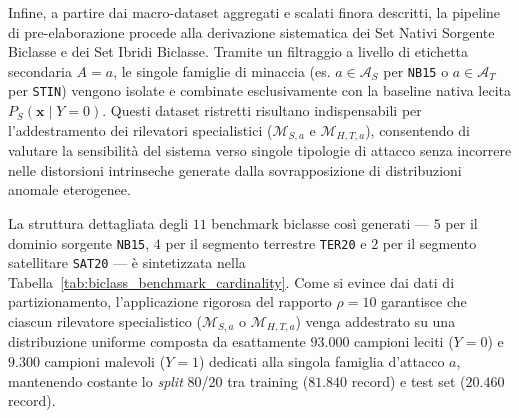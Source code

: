 \begin{table}[H]
    \centering
    \small
    \caption{Riepilogo delle cardinalità finali per i benchmark aggregati.}
    \label{tab:benchmark_cardinality}
\end{table}

Infine, a partire dai macro-dataset aggregati e scalati finora descritti, la pipeline di pre-elaborazione procede alla derivazione sistematica dei Set Nativi Sorgente Biclasse e dei Set Ibridi Biclasse. 
Tramite un filtraggio a livello di etichetta secondaria $A=a$, le singole famiglie di minaccia (es. $a \in \mathcal{A}_S$ per \texttt{NB15} o $a \in \mathcal{A}_T$ per \texttt{STIN}) vengono isolate e combinate esclusivamente con la baseline nativa lecita $P_S(\mathbf{x} \mid Y = 0)$. 
Questi dataset ristretti risultano indispensabili per l'addestramento dei rilevatori specialistici ($\mathcal{M}_{S,a}$ e $\mathcal{M}_{H,T,a}$), consentendo di valutare la sensibilità del sistema verso singole tipologie di attacco senza incorrere nelle distorsioni intrinseche generate dalla sovrapposizione di distribuzioni anomale eterogenee.

La struttura dettagliata degli $11$ benchmark biclasse così generati — $5$ per il dominio sorgente \texttt{NB15}, $4$ per il segmento terrestre \texttt{TER20} e $2$ per il segmento satellitare \texttt{SAT20} — è sintetizzata nella Tabella~\ref{tab:biclass_benchmark_cardinality}. 
Come si evince dai dati di partizionamento, l'applicazione rigorosa del rapporto $\rho = 10$ garantisce che ciascun rilevatore specialistico ($\mathcal{M}_{S,a}$ o $\mathcal{M}_{H,T,a}$) venga addestrato su una distribuzione uniforme composta da esattamente $93.000$ campioni leciti ($Y=0$) e $9.300$ campioni malevoli ($Y=1$) dedicati alla singola famiglia d'attacco $a$, mantenendo costante lo \textit{split} 80/20 tra training ($81.840$ record) e test set ($20.460$ record).

